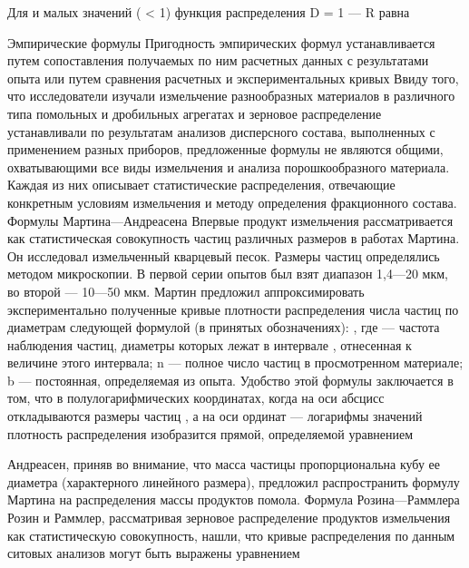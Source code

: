 Для   и малых значений   ( < 1) функция распределения D = 1 — R равна 
 
Эмпирические формулы 
Пригодность эмпирических формул устанавливается путем сопоставления получаемых по ним расчетных данных с результатами опыта или путем сравнения расчетных и экспериментальных кривых 
Ввиду того, что исследователи изучали измельчение разнообразных материалов в различного типа помольных и дробильных агрегатах и зерновое распределение устанавливали по результатам анализов дисперсного состава, выполненных с применением разных приборов, предложенные формулы не являются общими, охватывающими все виды измельчения и анализа порошкообразного материала. Каждая из них описывает статистические распределения, отвечающие конкретным условиям измельчения и методу определения фракционного состава. 
Формулы Мартина—Андреасена 
Впервые продукт измельчения рассматривается как статистическая совокупность частиц различных размеров в работах Мартина. Он исследовал измельченный кварцевый песок. Размеры частиц определялись методом микроскопии. В первой серии опытов был взят диапазон 1,4—20 мкм, во второй — 10—50 мкм. Мартин предложил аппроксимировать экспериментально полученные кривые плотности распределения числа частиц по диаметрам следующей формулой (в принятых обозначениях): 
 ,
где  — частота наблюдения частиц, диаметры которых лежат в интервале  , отнесенная к величине этого интервала; n — полное число частиц в просмотренном материале; b — постоянная, определяемая из опыта. 
Удобство этой формулы заключается в том, что в полулогарифмических координатах, когда на оси абсцисс откладываются размеры частиц  , а на оси ординат — логарифмы значений  плотность распределения изобразится прямой, определяемой уравнением 
 
Андреасен, приняв во внимание, что масса частицы пропорциональна кубу ее диаметра (характерного линейного размера), предложил распространить формулу Мартина на 
распределения массы продуктов помола. 
Формула Розина—Раммлера 
Розин и Раммлер, рассматривая зерновое распределение продуктов измельчения как статистическую совокупность, нашли, что кривые распределения по данным ситовых анализов могут быть выражены уравнением 
 
